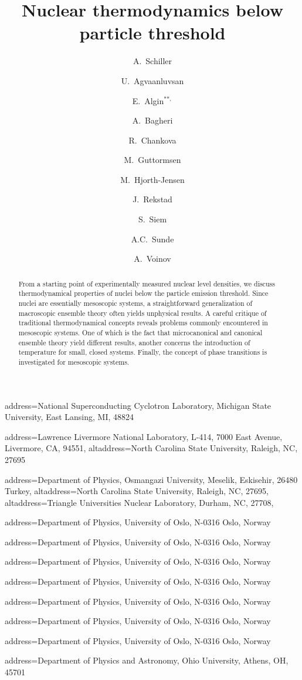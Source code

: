 \documentclass[sort&compress,final,numberedheadings]{aipproc}
\begin{document}
\title{Nuclear thermodynamics below particle threshold}



\author{A.~Schiller}{
address={National Superconducting Cyclotron Laboratory, Michigan State 
University, East Lansing, MI, 48824}
}

\author{U.~Agvaanluvsan}{
address={Lawrence Livermore National Laboratory, L-414, 7000 East Avenue, 
Livermore, CA, 94551},
altaddress={North Carolina State University, Raleigh, NC, 27695}
}

\author{E.~Algin$^{\scriptscriptstyle **,}$}{
address={Department of Physics, Osmangazi University, Meselik, Eskisehir, 26480
Turkey},
altaddress={North Carolina State University, Raleigh, NC, 27695},
altaddress={Triangle Universities Nuclear Laboratory, Durham, NC, 27708}, 
}

\author{A.~Bagheri}{
address={Department of Physics, University of Oslo, N-0316 Oslo, Norway}
}

\author{R.~Chankova}{
address={Department of Physics, University of Oslo, N-0316 Oslo, Norway}
}

\author{M.~Guttormsen}{
address={Department of Physics, University of Oslo, N-0316 Oslo, Norway}
}

\author{M.~Hjorth-Jensen}{
address={Department of Physics, University of Oslo, N-0316 Oslo, Norway}
}

\author{J.~Rekstad}{
address={Department of Physics, University of Oslo, N-0316 Oslo, Norway}
}

\author{S.~Siem}{
address={Department of Physics, University of Oslo, N-0316 Oslo, Norway}
}

\author{A.C.~Sunde}{
address={Department of Physics, University of Oslo, N-0316 Oslo, Norway}
}

\author{A.~Voinov}{
address={Department of Physics and Astronomy, Ohio University, Athens, OH, 
45701}
}

\begin{abstract}
From a starting point of experimentally measured nuclear level densities, we 
discuss thermodynamical properties of nuclei below the particle emission 
threshold. Since nuclei are essentially mesoscopic systems, a straightforward 
generalization of macroscopic ensemble theory often yields unphysical results.
A careful critique of traditional thermodynamical concepts reveals problems 
commonly encountered in mesoscopic systems. One of which is the fact that 
microcanonical and canonical ensemble theory yield different results, another 
concerns the introduction of temperature for small, closed systems. Finally, 
the concept of phase transitions is investigated for mesoscopic systems.
\end{abstract}
\end{document}
